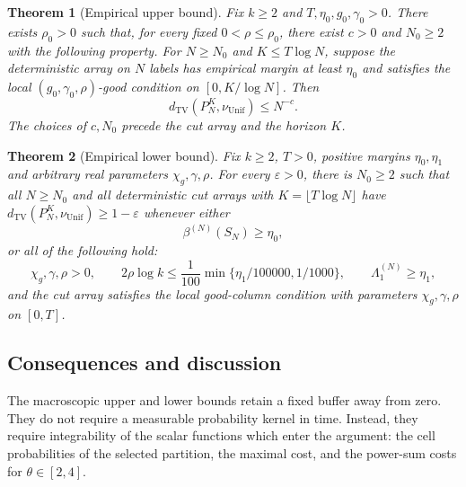 \documentclass[11pt]{article}
\numberwithin{equation}{section}
\newtheorem{theorem}{Theorem}[section]
\theoremstyle{definition}
\theoremstyle{remark}
\newcommand{\TV}{\mathrm{TV}}
\newcommand{\Unif}{\mathrm{Unif}}
\newcommand{\dTV}{d_{\TV}}
\newcommand{\nuUnif}{\nu_{\Unif}}
\newcommand{\1}{\mathbf 1}
\begin{document}
\begin{theorem}[Empirical upper bound]%
\label{thm:upper-empirical}
Fix $k\ge2$ and $T,\eta_0,g_0,\gamma_0>0$. There exists $\rho_0>0$
such that, for every fixed $0<\rho\le\rho_0$, there exist $c>0$ and
$N_0\ge2$ with the following property. For $N\ge N_0$ and
$K\le T\log N$, suppose the deterministic array on $N$ labels has
empirical margin at least $\eta_0$ and satisfies the local
$(g_0,\gamma_0,\rho)$-good condition on $[0,K/\log N]$. Then
\begin{equation}\label{eq:upper-empirical-tv}
 \dTV(P_N^K,\nuUnif)\le N^{-c}.
\end{equation}
The choices of $c,N_0$ precede the cut array and the horizon $K$.
\end{theorem}

\begin{theorem}[Empirical lower bound]%
\label{thm:empirical-lower}
Fix $k\ge2$, $T>0$, positive margins $\eta_0,\eta_1$ and arbitrary real parameters
$\chi_g,\gamma,\rho$. For every $\varepsilon>0$, there is $N_0\ge2$ such
that all $N\ge N_0$ and all deterministic cut arrays with $K=\lfloor T\log N\rfloor$ have
$\dTV(P_N^K,\nuUnif)\ge1-\varepsilon$ whenever either
\[
 \beta^{(N)}(S_N)\ge\eta_0,
\]
or all of the following hold:
\[
 \chi_g,\gamma,\rho>0,\qquad
 2\rho\log k\le\frac1{100}\min\{\eta_1/100000,1/1000\},\qquad
 \Lambda_1^{(N)}\ge\eta_1,
\]
and the cut array satisfies the local good-column condition with
parameters $\chi_g,\gamma,\rho$ on $[0,T]$.
\end{theorem}

\subsection{Consequences and discussion}

The macroscopic upper and lower bounds retain a fixed buffer away from
zero. They do not require a measurable probability kernel in time. Instead,
they require integrability of the scalar functions which enter the
argument: the cell probabilities of the selected partition, the maximal
cost, and the power-sum costs for $\theta\in[2,4]$.
\end{document}

